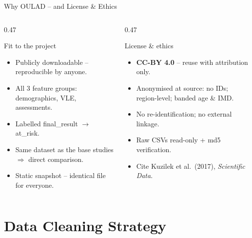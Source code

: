 \documentclass[aspectratio=169,10pt]{beamer}
\newcommand{\tcode}[1]{{\ttfamily #1}}
\begin{document}
\begin{frame}{Why OULAD -- and License \& Ethics}
  \begin{columns}[t,onlytextwidth]
    \begin{column}{0.47\textwidth}
      \begin{block}{Fit to the project}
        \scriptsize
        \begin{itemize}\setlength\itemsep{0.25em}
          \item Publicly downloadable -- reproducible by anyone.
          \item All 3 feature groups: demographics, VLE, assessments.
          \item Labelled \tcode{final\_result} $\to$ \tcode{at\_risk}.
          \item Same dataset as the base studies $\Rightarrow$ direct comparison.
          \item Static snapshot -- identical file for everyone.
        \end{itemize}
      \end{block}
    \end{column}
    \hfill
    \begin{column}{0.47\textwidth}
      \begin{block}{License \& ethics}
        \scriptsize
        \begin{itemize}\setlength\itemsep{0.25em}
          \item \textbf{CC-BY 4.0} -- reuse with attribution only.
          \item Anonymised at source: no IDs; region-level; banded age \& IMD.
          \item No re-identification; no external linkage.
          \item Raw CSVs read-only + md5 verification.
          \item Cite Kuzilek et al.\ (2017), \emph{Scientific Data}.
        \end{itemize}
      \end{block}
    \end{column}
  \end{columns}
\end{frame}

\section{Data Cleaning Strategy}
\end{document}
